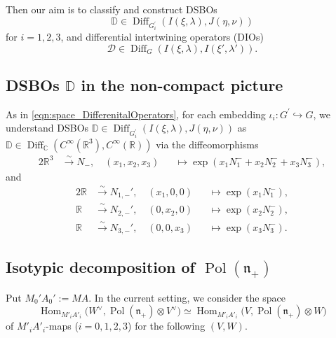 \documentclass[a4paper,11pt,reqno]{amsart}
\newcommand{\frakn}{\mathfrak{n}}
\newcommand{\CC}{\mathbb{C}}
\newcommand{\DD}{\mathbb{D}}
\newcommand{\0}{{\bf 0}}
\newcommand{\R}{\mathbb{R}}
\newcommand{\1}{{\bf 1}}
\DeclareMathOperator{\Hom}{Hom}
\DeclareMathOperator{\Pol}{Pol}
\DeclareMathOperator{\Diff}{Diff}
\DeclareMathOperator{\To}{\longrightarrow}
\theoremstyle{plain}
\theoremstyle{definition}
\numberwithin{equation}{section}
\theoremstyle{definition}
\begin{document}
Then our aim is to classify and construct DSBOs
\begin{equation*}
\DD \in \Diff_{G_i^\prime}(I(\xi, \lambda), J(\eta,\nu))
\end{equation*}
for $i=1,2,3$, and differential intertwining operators (DIOs)
\begin{equation*}
\mathcal{D} \in \Diff_{G}(I(\xi, \lambda), I(\xi',\lambda')).
\end{equation*}

\subsection{DSBOs \texorpdfstring{$\DD$}{D} in the non-compact picture}

As in \eqref{eqn:space_DifferenitalOperators},
for each embedding $\iota_i \colon G^\prime \hookrightarrow G$,
we understand DSBOs
$\DD \in \Diff_{G_i^\prime}(I(\xi, \lambda), J(\eta,\nu))$
as 
$\DD\in \Diff_\CC(C^\infty(\R^3), C^\infty(\R))$
via the diffeomorphisms
\begin{alignat}{2}\label{eqn:coordinate}
\R^{3} 
&\stackrel{\sim}{\To} N_-, \quad (x_1, x_2, x_3) 
&&\mapsto \exp(x_1 N^-_1 + x_2 N^-_2+x_3N^-_3),
\end{alignat}
and
\begin{alignat}{2}
\R 
&\stackrel{\sim}{\To} N_{1,-}', \quad (x_1,0, 0) 
&&\mapsto \exp(x_1 N^-_1), \label{eqn:coordinate1}\\[3pt]
\R
&\stackrel{\sim}{\To} N_{2,-}', \quad (0,x_2,0) 
&&\mapsto \exp(x_2 N^-_2), \label{eqn:coordinate2}\\[3pt]
\R
&\stackrel{\sim}{\To} N_{3,-}', \quad (0,0, x_3) 
&&\mapsto \exp(x_3 N^-_3). \label{eqn:coordinate3}
\end{alignat}

\subsection{Isotypic decomposition of \texorpdfstring{$\Pol(\frakn_+)$}{Pol(n_+)}}

Put $M_0'A_0':=MA$. 
In the current setting, we consider the space
\begin{equation}\label{eqn:VW}
\Hom_{M'_iA'_i}\big(W^\vee,\Pol(\frakn_+)\otimes V^\vee\big)
\simeq 
\Hom_{M'_iA'_i}\big(V,\Pol(\frakn_+)\otimes W\big)
\end{equation}
of $M'_iA'_i$-maps ($i=0,1,2,3$)  for the following $(V,W)$.
\vskip 0.1in
\end{document}
